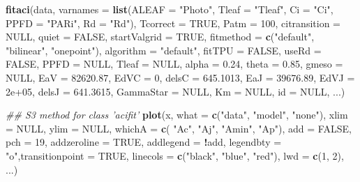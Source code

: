 \documentclass[
]{krantz}
\makeatletter
\newenvironment{Shaded}{\begin{snugshade}}{\end{snugshade}}
\newcommand{\CommentTok}[1]{\textcolor[rgb]{0.56,0.35,0.01}{\textit{#1}}}
\newcommand{\DataTypeTok}[1]{\textcolor[rgb]{0.13,0.29,0.53}{#1}}
\newcommand{\DecValTok}[1]{\textcolor[rgb]{0.00,0.00,0.81}{#1}}
\newcommand{\FloatTok}[1]{\textcolor[rgb]{0.00,0.00,0.81}{#1}}
\newcommand{\KeywordTok}[1]{\textcolor[rgb]{0.13,0.29,0.53}{\textbf{#1}}}
\newcommand{\NormalTok}[1]{#1}
\newcommand{\OperatorTok}[1]{\textcolor[rgb]{0.81,0.36,0.00}{\textbf{#1}}}
\newcommand{\OtherTok}[1]{\textcolor[rgb]{0.56,0.35,0.01}{#1}}
\newcommand{\StringTok}[1]{\textcolor[rgb]{0.31,0.60,0.02}{#1}}
\newenvironment{kframe}{%
\medskip{}
\setlength{\fboxsep}{.8em}
 \def\at@end@of@kframe{}%
 \ifinner\ifhmode%
  \def\at@end@of@kframe{\end{minipage}}%
  \begin{minipage}{\columnwidth}%
 \fi\fi%
 \def\FrameCommand##1{\hskip\@totalleftmargin \hskip-\fboxsep
 \colorbox{shadecolor}{##1}\hskip-\fboxsep
     \hskip-\linewidth \hskip-\@totalleftmargin \hskip\columnwidth}%
 \MakeFramed {\advance\hsize-\width
   \@totalleftmargin\z@ \linewidth\hsize
   \@setminipage}}%
 {\par\unskip\endMakeFramed%
 \at@end@of@kframe}
\renewenvironment{Shaded}{\begin{kframe}}{\end{kframe}}
\makeatother
\begin{document}
\begin{Shaded}
\begin{Highlighting}[]
\KeywordTok{fitaci}\NormalTok{(data, }\DataTypeTok{varnames =} \KeywordTok{list}\NormalTok{(}\DataTypeTok{ALEAF =} \StringTok{"Photo"}\NormalTok{, }
  \DataTypeTok{Tleaf =} \StringTok{"Tleaf"}\NormalTok{, }\DataTypeTok{Ci =} \StringTok{"Ci"}\NormalTok{, }\DataTypeTok{PPFD =} \StringTok{"PARi"}\NormalTok{, }
  \DataTypeTok{Rd =} \StringTok{"Rd"}\NormalTok{), }\DataTypeTok{Tcorrect =} \OtherTok{TRUE}\NormalTok{, }\DataTypeTok{Patm =} \DecValTok{100}\NormalTok{, }
  \DataTypeTok{citransition =} \OtherTok{NULL}\NormalTok{, }\DataTypeTok{quiet =} \OtherTok{FALSE}\NormalTok{, }
  \DataTypeTok{startValgrid =} \OtherTok{TRUE}\NormalTok{, }\DataTypeTok{fitmethod =} 
  \KeywordTok{c}\NormalTok{(}\StringTok{"default"}\NormalTok{, }\StringTok{"bilinear"}\NormalTok{, }\StringTok{"onepoint"}\NormalTok{), }
  \DataTypeTok{algorithm =} \StringTok{"default"}\NormalTok{, }\DataTypeTok{fitTPU =} \OtherTok{FALSE}\NormalTok{, }
  \DataTypeTok{useRd =} \OtherTok{FALSE}\NormalTok{, }\DataTypeTok{PPFD =} \OtherTok{NULL}\NormalTok{, }\DataTypeTok{Tleaf =} \OtherTok{NULL}\NormalTok{, }
  \DataTypeTok{alpha =} \FloatTok{0.24}\NormalTok{, }\DataTypeTok{theta =} \FloatTok{0.85}\NormalTok{, }\DataTypeTok{gmeso =} \OtherTok{NULL}\NormalTok{, }
  \DataTypeTok{EaV =} \FloatTok{82620.87}\NormalTok{, }\DataTypeTok{EdVC =} \DecValTok{0}\NormalTok{, }\DataTypeTok{delsC =} \FloatTok{645.1013}\NormalTok{,}
  \DataTypeTok{EaJ =} \FloatTok{39676.89}\NormalTok{, }\DataTypeTok{EdVJ =} \FloatTok{2e+05}\NormalTok{, }
  \DataTypeTok{delsJ =} \FloatTok{641.3615}\NormalTok{, }\DataTypeTok{GammaStar =} \OtherTok{NULL}\NormalTok{, }
  \DataTypeTok{Km =} \OtherTok{NULL}\NormalTok{, }\DataTypeTok{id =} \OtherTok{NULL}\NormalTok{, ...)}

\CommentTok{## S3 method for class 'acifit'}
\KeywordTok{plot}\NormalTok{(x, }\DataTypeTok{what =} \KeywordTok{c}\NormalTok{(}\StringTok{"data"}\NormalTok{, }\StringTok{"model"}\NormalTok{, }\StringTok{"none"}\NormalTok{),}
     \DataTypeTok{xlim =} \OtherTok{NULL}\NormalTok{, }\DataTypeTok{ylim =} \OtherTok{NULL}\NormalTok{, }\DataTypeTok{whichA =} \KeywordTok{c}\NormalTok{(}
       \StringTok{"Ac"}\NormalTok{, }\StringTok{"Aj"}\NormalTok{, }\StringTok{"Amin"}\NormalTok{, }\StringTok{"Ap"}\NormalTok{), }\DataTypeTok{add =} \OtherTok{FALSE}\NormalTok{,}
\DataTypeTok{pch =} \DecValTok{19}\NormalTok{, }\DataTypeTok{addzeroline =} \OtherTok{TRUE}\NormalTok{, }\DataTypeTok{addlegend =} 
  \OperatorTok{!}\NormalTok{add, }\DataTypeTok{legendbty =} \StringTok{"o"}\NormalTok{,}\DataTypeTok{transitionpoint =} \OtherTok{TRUE}\NormalTok{, }
\DataTypeTok{linecols =} \KeywordTok{c}\NormalTok{(}\StringTok{"black"}\NormalTok{, }\StringTok{"blue"}\NormalTok{, }\StringTok{"red"}\NormalTok{), }\DataTypeTok{lwd =} \KeywordTok{c}\NormalTok{(}\DecValTok{1}\NormalTok{,}
\DecValTok{2}\NormalTok{), ...)}
\end{Highlighting}
\end{Shaded}
\end{document}
